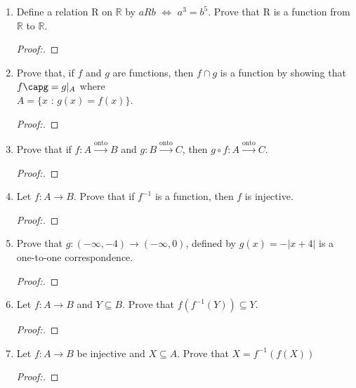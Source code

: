 \documentclass[11pt]{article}
\begin{document}
\begin{enumerate}
    \item Define a relation R on $\mathbb{R}$ by $aRb$ $\iff$ $a^3=b^5$. Prove that R is a function from $\mathbb{R}$ to $\mathbb{R}.$
       \begin{proof}[Proof:\nopunct]
        \end{proof}
        
    \item Prove that, if $f$ and $g$ are functions, then $f \cap g$ is a function by showing that $f\capg = g|_{A}$ where \\ $A = \{x$ : $g(x) = f(x) \}.$
       \begin{proof}[Proof:\nopunct]
        \end{proof}
        
    \item Prove that if $f:A \xrightarrow{\text{onto}} B$ and $g:B\xrightarrow{\text{onto}} C$, then $g\circ f:A \xrightarrow{\text{onto}} C.$
        \begin{proof}[Proof:\nopunct]
        \end{proof}
        
    \item Let $f:A\xrightarrow{} B$. Prove that if $f^{-1}$ is a function, then $f$ is injective.
       \begin{proof}[Proof:\nopunct]
        \end{proof}
        
    \item Prove that $g:(-\infty, -4)\rightarrow(-\infty,0)$, defined by $g(x) = -|x+4|$ is a one-to-one correspondence.
       \begin{proof}[Proof:\nopunct]
        \end{proof}
        
    \item Let $f:A \rightarrow B$ and $Y \subseteq B.$ Prove that $f(f^{-1}(Y)) \subseteq Y.$
        \begin{proof}[Proof:\nopunct]
        \end{proof}
        
    \item Let $f:A \rightarrow B$ be injective and $X \subseteq A.$ \newline Prove that $X = f^{-1}(f(X))$ 
        \begin{proof}[Proof:\nopunct]
        \end{proof}
    
\end{enumerate}
\end{document}
